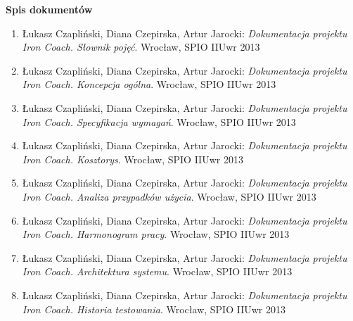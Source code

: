 

\begin{center}
\end{center}

\newcommand{\quickbib}[1]{\item Łukasz Czapliński, Diana Czepirska, Artur Jarocki: {\it Dokumentacja projektu Iron Coach. #1}. Wrocław, SPIO IIUwr 2013}

\vspace*{1cm}
{\textbf{\Large{Spis dokumentów}}}\vspace{0.5cm}
\large
\begin{enumerate}\itemsep5pt
      \quickbib{ Słownik pojęć}
      \quickbib{ Koncepcja ogólna}
      \quickbib{ Specyfikacja wymagań}
      \quickbib{ Kosztorys}
      \quickbib{ Analiza przypadków użycia}
      \quickbib{ Harmonogram pracy}
      \quickbib{ Architektura systemu}
      \quickbib{ Historia testowania}
\end{enumerate}
\vfill


